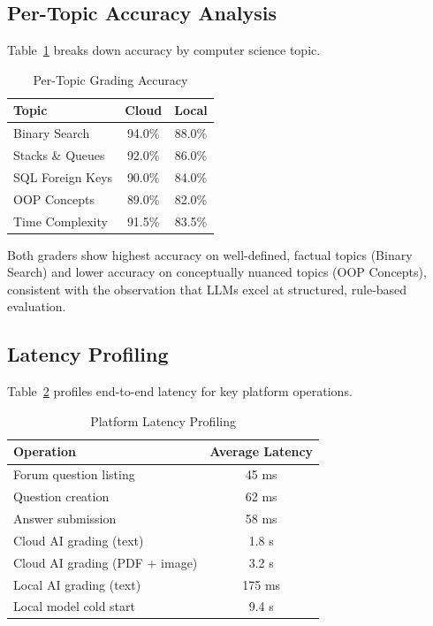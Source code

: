 \documentclass[conference]{IEEEtran}
\begin{document}
\subsection{Per-Topic Accuracy Analysis}
Table~\ref{tab:per_topic} breaks down accuracy by computer science topic.

\begin{table}[h]
\caption{Per-Topic Grading Accuracy}
\label{tab:per_topic}
\begin{center}
\begin{tabular}{lcc}
\toprule
\textbf{Topic} & \textbf{Cloud} & \textbf{Local} \\
\midrule
Binary Search & 94.0\% & 88.0\% \\
Stacks \& Queues & 92.0\% & 86.0\% \\
SQL Foreign Keys & 90.0\% & 84.0\% \\
OOP Concepts & 89.0\% & 82.0\% \\
Time Complexity & 91.5\% & 83.5\% \\
\bottomrule
\end{tabular}
\end{center}
\end{table}

Both graders show highest accuracy on well-defined, factual topics (Binary Search) and lower accuracy on conceptually nuanced topics (OOP Concepts), consistent with the observation that LLMs excel at structured, rule-based evaluation.

\subsection{Latency Profiling}
Table~\ref{tab:latency} profiles end-to-end latency for key platform operations.

\begin{table}[h]
\caption{Platform Latency Profiling}
\label{tab:latency}
\begin{center}
\begin{tabular}{lc}
\toprule
\textbf{Operation} & \textbf{Average Latency} \\
\midrule
Forum question listing & 45 ms \\
Question creation & 62 ms \\
Answer submission & 58 ms \\
Cloud AI grading (text) & 1.8 s \\
Cloud AI grading (PDF + image) & 3.2 s \\
Local AI grading (text) & 175 ms \\
Local model cold start & 9.4 s \\
\bottomrule
\end{tabular}
\end{center}
\end{table}
\end{document}
